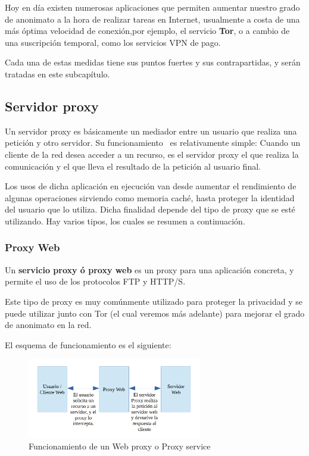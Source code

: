 Hoy en día existen numerosas aplicaciones que permiten aumentar nuestro grado de anonimato a la hora de realizar tareas en Internet, usualmente a costa de una más óptima velocidad de conexión,por ejemplo, el servicio \textbf{Tor}, o a cambio de una suscripción temporal, como los servicios VPN de pago.

Cada una de estas medidas tiene sus puntos fuertes y sus contrapartidas, y serán tratadas en este subcapítulo.

\subsection{Servidor proxy}

Un servidor proxy es básicamente un mediador entre un usuario que realiza una petición y otro servidor.
Su funcionamiento ~\cite{article:proxy}es relativamente simple: Cuando un cliente de la red desea acceder a un recurso, es el servidor proxy el que realiza la comunicación y el que lleva el resultado de la petición al usuario final. 

Los usos de dicha aplicación en ejecución van desde aumentar el rendimiento de algunas operaciones sirviendo como memoria caché, hasta proteger la identidad del usuario que lo utiliza.
Dicha finalidad depende del tipo de proxy que se esté utilizando.
Hay varios tipos, los cuales se resumen a continuación.

\subsubsection{Proxy Web}

Un \textbf{servicio proxy ó proxy web} es un proxy para una aplicación concreta, y permite el uso de los protocolos FTP y HTTP/S.

Este tipo de proxy es muy comúnmente utilizado para proteger la privacidad y se puede utilizar junto con Tor (el cual veremos más adelante) para mejorar el grado de anonimato en la red.

El esquema de funcionamiento es el siguiente:

\begin{figure}[h]
	\centerline{
		\mbox{\includegraphics[width=3.00in]{images/proxy_web.png}}
	}
	\caption{Funcionamiento de un Web proxy o Proxy service}
	\label{fig:web_proxy}
\end{figure}

